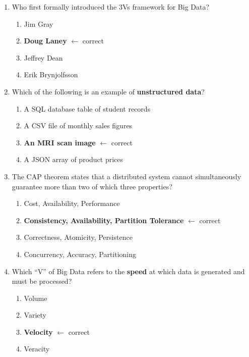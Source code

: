 \documentclass[12pt,a4paper]{article}
\begin{document}
\begin{enumerate}[label=\textbf{Q\arabic*.}, leftmargin=2.5em, itemsep=10pt]

  \item Who first formally introduced the 3Vs framework for Big Data?
  \begin{enumerate}[label=(\alph*), leftmargin=2em, nosep, after=\vspace{4pt}]
    \item Jim Gray
    \item \textbf{Doug Laney} \textcolor{PUGreen}{\small $\leftarrow$ correct}
    \item Jeffrey Dean
    \item Erik Brynjolfsson
  \end{enumerate}

  \item Which of the following is an example of \textbf{unstructured data}?
  \begin{enumerate}[label=(\alph*), leftmargin=2em, nosep, after=\vspace{4pt}]
    \item A SQL database table of student records
    \item A CSV file of monthly sales figures
    \item \textbf{An MRI scan image} \textcolor{PUGreen}{\small $\leftarrow$ correct}
    \item A JSON array of product prices
  \end{enumerate}

  \item The CAP theorem states that a distributed system cannot simultaneously guarantee more than two of which three properties?
  \begin{enumerate}[label=(\alph*), leftmargin=2em, nosep, after=\vspace{4pt}]
    \item Cost, Availability, Performance
    \item \textbf{Consistency, Availability, Partition Tolerance} \textcolor{PUGreen}{\small $\leftarrow$ correct}
    \item Correctness, Atomicity, Persistence
    \item Concurrency, Accuracy, Partitioning
  \end{enumerate}

  \item Which ``V'' of Big Data refers to the \textbf{speed} at which data is generated and must be processed?
  \begin{enumerate}[label=(\alph*), leftmargin=2em, nosep, after=\vspace{4pt}]
    \item Volume
    \item Variety
    \item \textbf{Velocity} \textcolor{PUGreen}{\small $\leftarrow$ correct}
    \item Veracity
  \end{enumerate}

\end{enumerate}
\end{document}
